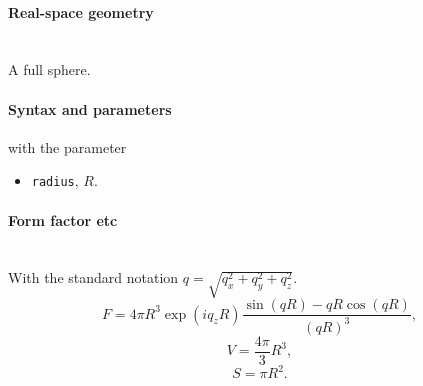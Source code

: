 \paragraph{Real-space geometry}\strut\\
A full sphere.

\begin{figure}[h]
\hfill
{}
\hfill
{}
\hfill
{}
\hfill
\end{figure}

\FloatBarrier

\paragraph{Syntax and parameters}
\begin{quote}
\end{quote}
with the parameter
\begin{itemize}
\item \texttt{radius}, $R$.
\end{itemize}


\paragraph{Form factor etc}\strut\\
With the standard notation $q=\sqrt{q_x^2 + q_y^2 + q_z^2}$.
\begin{equation*}
F = 4\pi R^3 \exp(iq_z R)\frac{\sin(q R) - q R \cos(q R)}{(qR)^3},
\end{equation*}
\begin{equation*}
  V = \dfrac{4\pi}{3}R^3,
\end{equation*}
\begin{equation*}
  S= \pi R^2.
\end{equation*}

